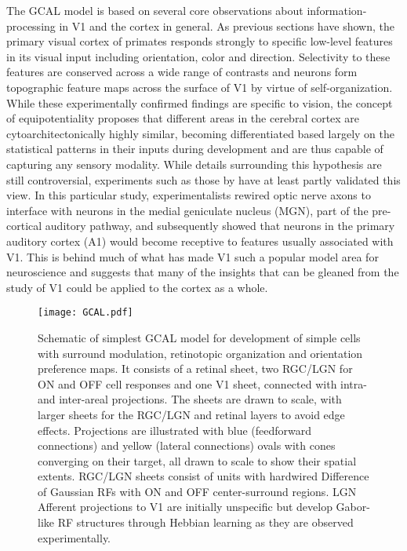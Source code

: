 The GCAL model is based on several core observations about
information-processing in V1 and the cortex in general. As previous
sections have shown, the primary visual cortex of primates responds
strongly to specific low-level features in its visual input including
orientation, color and direction. Selectivity to these features are
conserved across a wide range of contrasts and neurons form
topographic feature maps across the surface of V1 by virtue of
self-organization. While these experimentally confirmed findings are
specific to vision, the concept of equipotentiality proposes that
different areas in the cerebral cortex are cytoarchitectonically
highly similar, becoming differentiated based largely on the
statistical patterns in their inputs during development and are thus
capable of capturing any sensory modality. While details surrounding
this hypothesis are still controversial, experiments such as those by
\cite{Sur1990} have at least partly validated this view. In this
particular study, experimentalists rewired optic nerve axons to
interface with neurons in the medial geniculate nucleus (MGN), part of
the pre-cortical auditory pathway, and subsequently showed that
neurons in the primary auditory cortex (A1) would become receptive to
features usually associated with V1. This is behind much of what has
made V1 such a popular model area for neuroscience and suggests that
many of the insights that can be gleaned from the study of V1 could be
applied to the cortex as a whole.

\begin{figure}
	\centering \texttt{[image: GCAL.pdf]}
	\caption{Schematic of simplest GCAL model for development
        of simple cells with surround modulation, retinotopic
        organization and orientation preference maps. It consists of a
        retinal sheet, two RGC/LGN for ON and OFF cell responses and
        one V1 sheet, connected with intra- and inter-areal
        projections. The sheets are drawn to scale, with larger sheets
        for the RGC/LGN and retinal layers to avoid edge
        effects. Projections are illustrated with blue (feedforward
        connections) and yellow (lateral connections) ovals with cones
        converging on their target, all drawn to scale to show their
        spatial extents. RGC/LGN sheets consist of units with
        hardwired Difference of Gaussian RFs with ON and OFF
        center-surround regions. LGN Afferent projections to V1 are
        initially unspecific but develop Gabor-like RF structures
        through Hebbian learning as they are observed experimentally.}
	\label{GCAL}
\end{figure}

